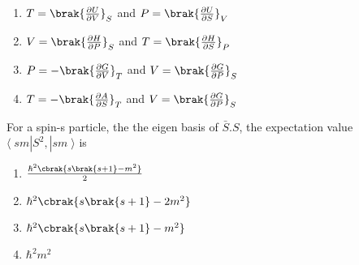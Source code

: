             \hfill{}
            \begin{enumerate}
                \item $T = \brak{\frac{\partial U}{\partial V}}_S$ and  $P = \brak{\frac{\partial U}{\partial S}}_V$
                \item $V = \brak{\frac{\partial H}{\partial P}}_S$ and  $T = \brak{\frac{\partial H}{\partial S}}_P$
                \item $P = -\brak{\frac{\partial G}{\partial V}}_T$ and  $V = \brak{\frac{\partial G}{\partial P}}_S$
                \item $T = -\brak{\frac{\partial A}{\partial S}}_T$ and  $V = \brak{\frac{\partial G}{\partial P}}_S$
            \end{enumerate}

        \item[44.] For a spin-s particle, the the eigen basis of $\bar{S}.S$, the expectation value
            $\langle \; sm|S^2,|sm \; \rangle$ is

            \hfill{}
            \begin{enumerate}
                \item $\frac{\hbar ^ 2 \cbrak{s\brak{s + 1} - m^2}}{2}$
                \item $\hbar ^ 2 \cbrak{s\brak{s + 1} - 2m^2}$
                \item $\hbar ^ 2 \cbrak{s\brak{s + 1} - m^2}$
                \item $\hbar ^2 m^2$
            \end{enumerate}

